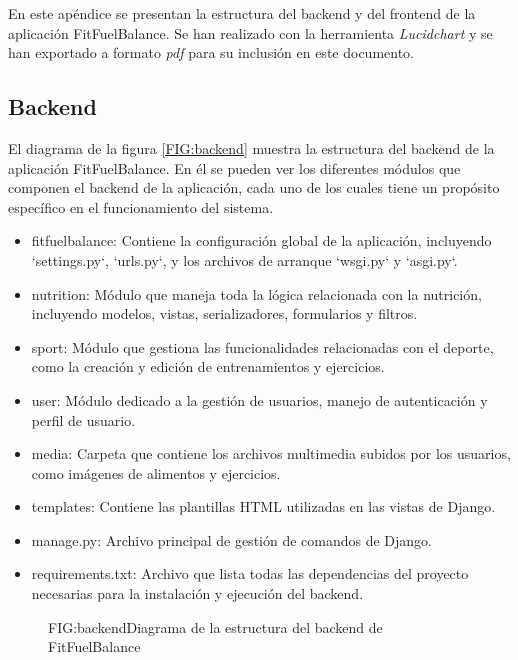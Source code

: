 En este apéndice se presentan la estructura del backend y del frontend de la aplicación FitFuelBalance. Se han realizado con la herramienta \textit{Lucidchart} y se han exportado a formato \textit{pdf} para su inclusión en este documento.

\subsection{Backend}

El diagrama de la figura \ref{FIG:backend} muestra la estructura del backend de la aplicación FitFuelBalance. En él se pueden ver los diferentes módulos que componen el backend de la aplicación, cada uno de los cuales tiene un propósito específico en el funcionamiento del sistema. 

\begin{itemize}
  \item fitfuelbalance: Contiene la configuración global de la aplicación, incluyendo `settings.py`, `urls.py`, y los archivos de arranque `wsgi.py` y `asgi.py`.
  \item nutrition: Módulo que maneja toda la lógica relacionada con la nutrición, incluyendo modelos, vistas, serializadores, formularios y filtros.
  \item sport: Módulo que gestiona las funcionalidades relacionadas con el deporte, como la creación y edición de entrenamientos y ejercicios.
  \item user: Módulo dedicado a la gestión de usuarios, manejo de autenticación y perfil de usuario.
  \item media: Carpeta que contiene los archivos multimedia subidos por los usuarios, como imágenes de alimentos y ejercicios.
  \item templates: Contiene las plantillas HTML utilizadas en las vistas de Django.
  \item manage.py: Archivo principal de gestión de comandos de Django.
  \item requirements.txt: Archivo que lista todas las dependencias del proyecto necesarias para la instalación y ejecución del backend.
\end{itemize}

\begin{figure}[Diagrama de la estructura del backend]{FIG:backend}{Diagrama de la estructura del backend de FitFuelBalance}
\end{figure}

\newpage

